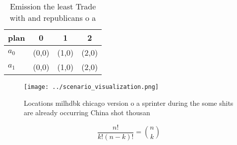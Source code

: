 \documentclass[a4paper]{article}
\begin{document}
\begin{table}
\begin{adjustbox}{width=0.6\columnwidth}
\begin{tabular}{|l|l|l|l|}
\hline
\textbf{plan} & \multicolumn{1}{c|}{\textbf{0}} & \multicolumn{1}{c|}{\textbf{1}} & \multicolumn{1}{c|}{\textbf{2}} \\ \hline
\textbf{$a_0$}  & (0,0) & (1,0) & (2,0) \\ \hline
\textbf{$a_1$}  & (0,0) & (1,0) & (2,0) \\ \hline
\end{tabular}
\end{adjustbox}
\caption{Emission the least Trade with and republicans o a
}
\end{table}

\begin{figure}
\centering
\texttt{[image: ../scenario\_visualization.png]}
\caption{Locations milhdbk chicago version o a sprinter during the some shits are already occurring China shot thousan
}
\end{figure}
 
\[ \frac{n!}{k!(n-k)!} = \binom{n}{k} \]
\end{document}
